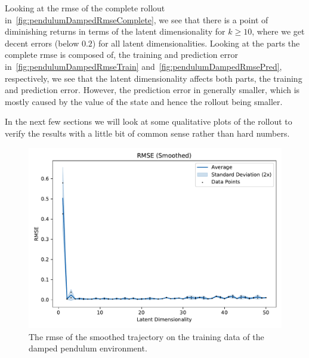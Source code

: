 			Looking at the \ac{rmse} of the complete rollout in~\autoref{fig:pendulumDampedRmseComplete}, we see that there is a point of diminishing returns in terms of the latent dimensionality for \( k \geq 10 \), where we get decent errors (below \( 0.2 \)) for all latent dimensionalities. Looking at the parts the complete \ac{rmse} is composed of, the training and prediction error in~\autoref{fig:pendulumDampedRmseTrain} and~\autoref{fig:pendulumDampedRmsePred}, respectively, we see that the latent dimensionality affects both parts, the training and prediction error. However, the prediction error in generally smaller, which is mostly caused by the value of the state and hence the rollout being smaller.

			In the next few sections we will look at some qualitative plots of the rollout to verify the results with a little bit of common sense rather than hard numbers.

			\begin{figure}
				\centering
				\includegraphics[width=0.7\linewidth]{figures/results/pendulum-damped/latent-dim/comparison-rmse-smoothed-mean-vs-latent-dim.pdf}
				\caption{The \ac{rmse} of the smoothed trajectory on the training data of the damped pendulum environment.}
				\label{fig:pendulumDampedRmseSmoothed}
			\end{figure}


